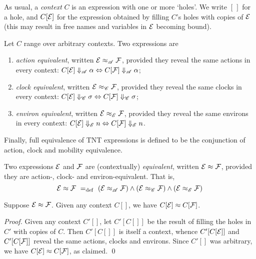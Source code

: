 \documentclass[orivec,envcountsame]{llncs}
\newcommand{\Reveals}[1]{\mathrel{\Downarrow_{#1}}}
\newcommand{\RevealsA}{\Reveals{\mathscr{A}}}
\newcommand{\RevealsC}{\Reveals{\mathscr{C}}}
\newcommand{\RevealsE}{\Reveals{\mathscr{E}}}
\newcommand{\Eq}{\approx}
\newcommand{\EqA}{\mathrel{\Eq_{\mathscr{A}}}}
\newcommand{\EqC}{\mathrel{\Eq_{\mathscr{C}}}}
\newcommand{\EqE}{\mathrel{\Eq_{\mathscr{E}}}}
\newcommand{\Means}{\mathrel{~=_{\mathrm{def}}~}}
\begin{document}
As usual, a \emph{context} $C$ is an expression with one or more `holes'. We write $[\,]$ for a hole, and $C[\text{$\mathcal{E}$}]$ for the expression obtained by filling $C$'s holes with copies of $\text{$\mathcal{E}$}$ (this may result in free names and variables in $\text{$\mathcal{E}$}$ becoming bound).

\begin{definition}
Let $C$ range over arbitrary contexts. Two expressions are
\begin{enumerate}
\item
    \emph{action equivalent}, written $\expr \EqA \exprb$, provided they reveal the same actions in every context: $C[\expr] \RevealsA \alpha \Leftrightarrow C[\exprb] \RevealsA \alpha$;
\item
    \emph{clock equivalent}, written $\expr \EqC \exprb$, provided they reveal the same clocks in every context: $C[\expr] \RevealsC \sigma \Leftrightarrow C[\exprb] \RevealsC \sigma$;

\item
    \emph{environ equivalent}, written $\expr \EqE \exprb$, provided they reveal the same environs in every context: $C[\expr] \RevealsE n \Leftrightarrow C[\exprb] \RevealsE n$.
\end{enumerate}
\end{definition}

Finally, full equivalence of TNT expressions is defined to be the conjunction of action, clock and mobility equivalence.
\begin{definition}
Two expressions $\text{$\mathcal{E}$}$ and $\text{$\mathcal{F}$}$ are (contextually) \emph{equivalent}, written $\expr \Eq \exprb$, provided they are action-, clock- and environ-equivalent. That is,
\[
    \expr \Eq \exprb
    \Means
    \left( \expr \EqA \exprb \right)
    \land
    \left( \expr \EqC \exprb \right)
    \land 
    \left( \expr \EqE \exprb \right)
\]
\end{definition}


\begin{proposition}
\label{prop:context-substitution}
Suppose $\expr \Eq \exprb$. Given any context $C[]$, we have $C[\expr] \Eq C[\exprb]$.
\end{proposition}
\begin{proof}
Given any context $C'[]$, let $C'[C[]]$ be the result of filling the holes in $C'$ with copies of $C$. Then $C'[C[]]$ is itself a context, whence $C'[C[\text{$\mathcal{E}$}]]$ and $C'[C[\text{$\mathcal{F}$}]]$ reveal the same actions, clocks and environs. Since $C'[]$ was arbitrary, we have $C[\expr] \Eq C[\exprb]$, as claimed.
\qed \end{proof}
\end{document}
